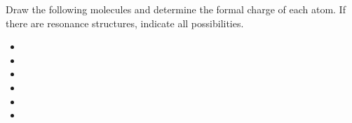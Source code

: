 \documentclass[12pt,letterpaper]{article}
\begin{document}
\clearpage

Draw the following molecules and determine the formal charge of each atom. If
there are resonance structures, indicate all possibilities.

\begin{itemize}
	\item {}
	\item {}
	\item {}
	\item {}
	\item {}
	\item {}
\end{itemize}
\end{document}

